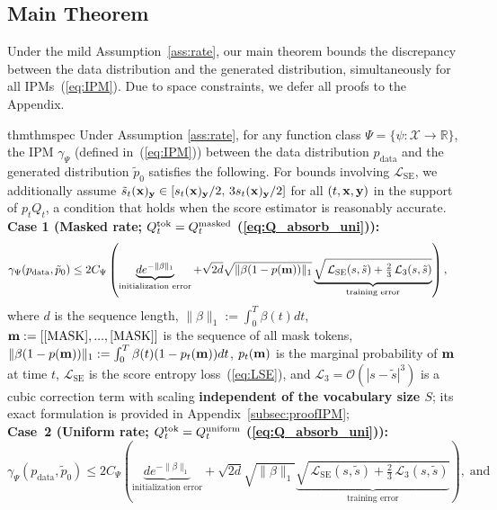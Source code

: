 \documentclass{article} %
\def\eqref#1{equation~\ref{#1}}
\newcommand{\bfx}{{\bf x}}
\newcommand{\bfy}{ {\bf y}}
\newcommand{\bfm}{{\bf m}}
\newcommand{\mask}{\text{[MASK]}}
\newcommand{\LSE}{\mathcal{L}_{\mathrm{SE}}}
\renewcommand{\eqref}[1]{\textup{(\ref{#1})}}
\newcommand{\LThree}{\mathcal{L}_{3}}
\begin{document}
\subsection{Main Theorem} 
Under the mild Assumption~\ref{ass:rate}, our main theorem bounds the discrepancy between the data distribution and the generated distribution, simultaneously for all IPMs~\eqref{eq:IPM}. Due to space constraints, we defer all proofs to the Appendix.

\begin{restatable}{thm}{thmspec}\label{thm:spec}
Under Assumption \ref{ass:rate}, for any function class $\Psi= \{\psi: \mathcal{X} \to \mathbb{R} \}$, the IPM $\gamma_\Psi$ (defined in~\eqref{eq:IPM}) between the data distribution
$p_{\mathrm{data}}$ and the generated distribution $\tilde p_0$ satisfies the following. For bounds involving $\LSE$, we additionally assume $\tilde s_t(\bfx)_\bfy \in [s_t(\bfx)_\bfy/2,\,3 s_t(\bfx)_\bfy/2]$ for all $(t, \bfx, \bfy)$ in the support of $p_t Q_t$, a condition that holds when the score estimator is reasonably accurate. \\
\textbf{Case 1 (Masked rate; $Q^{\mathrm{tok}}_t=Q_t^{\rm masked}$ \eqref{eq:Q_absorb_uni}):}
\begin{align}\label{eq:IPM_absorb}
    \begin{split}
    \gamma_\Psi(p_{\mathrm{data}}, \tilde{p}_0)  &\leq 2 C_\Psi \left( \underbrace{d e^{-\| \beta \|_1}}_{\text{initialization error}}   +   \sqrt{2 d} \sqrt{\| \beta (1-p(\bfm))\|_1} \underbrace{\sqrt{ \,\LSE(s, \tilde{s}) + \tfrac{2}{3}\,\LThree(s, \tilde{s}) }}_{\text{training error}} \right),
    \end{split}
\end{align}
where $d$ is the sequence length, $\| \beta \|_1:=\int_0^T \beta(t) dt$, $\bfm:=[\mask,...,\mask]$ is the sequence of all mask tokens, $\| \beta (1-p(\bfm))\|_1 :=  \int_0^T \beta(t) (1-p_t(\bfm)) dt  $, $p_t(\bfm)$ is the marginal probability of $\bfm$ at time $t$, $\LSE$ is the score entropy loss~\eqref{eq:LSE}, and $\LThree = \mathcal{O}(|s - \tilde{s}|^3)$ is a cubic correction term with scaling \textbf{independent of the vocabulary size $S$}; its exact formulation is provided in Appendix~\ref{subsec:proofIPM};\\
\textbf{Case~2 (Uniform rate; $Q^{\mathrm{tok}}_t=Q_t^{\rm uniform}$ \eqref{eq:Q_absorb_uni}):} 
\begin{equation}
    \gamma_\Psi(p_{\mathrm{data}}, \tilde{p}_0) \leq 2 C_\Psi \left( \underbrace{d e^{-\| \beta \|_1}}_{\text{initialization error}} +  \sqrt{2d} \sqrt{\|\beta \|_1}  \underbrace{\sqrt{\,\LSE(s, \tilde{s}) + \tfrac{2}{3}\,\LThree(s, \tilde{s})}}_{\text{training error}} \right), \; \text{and}

\end{equation}
\end{restatable}
\end{document}
